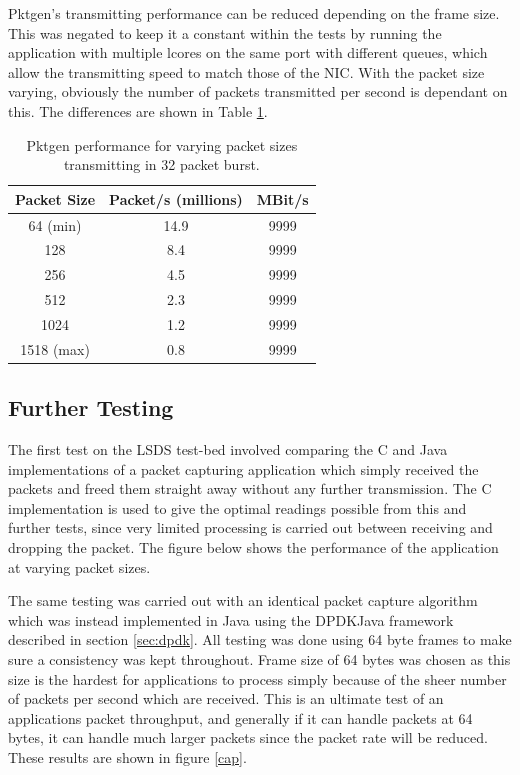 \documentclass[final_report.tex]{subfiles}
\begin{document}
Pktgen's transmitting performance can be reduced depending on the frame size. This was negated to keep it a constant within the tests by running the application with multiple lcores on the same port with different queues, which allow the transmitting speed to match those of the NIC. With the packet size varying, obviously the number of packets transmitted per second is dependant on this. The differences are shown in Table \ref{tab:pktgen}.

\begin{table}[H]
	\centering
	\begin{tabular} { | c | c | c | }
		\hline
		\textbf{Packet Size} & \textbf{Packet/s (millions)} & \textbf{MBit/s} \\
		\hline
		64 (min) & 14.9 & 9999 \\
		\hline
		128 & 8.4 & 9999 \\
		\hline
		256 & 4.5 & 9999 \\
		\hline
		512 & 2.3 & 9999 \\
		\hline
		1024 & 1.2 & 9999 \\
		\hline
		1518 (max) & 0.8 & 9999 \\
		\hline
	\end{tabular}
	\caption{Pktgen performance for varying packet sizes transmitting in 32 packet burst.}
	\label{tab:pktgen}
\end{table}

\subsection{Further Testing}
The first test on the LSDS test-bed involved comparing the C and Java implementations of a packet capturing application which simply received the packets and freed them straight away without any further transmission. The C implementation is used to give the optimal readings possible from this and further tests, since very limited processing is carried out between receiving and dropping the packet. The figure below shows the performance of the application at varying packet sizes.



The same testing was carried out with an identical packet capture algorithm which was instead implemented in Java using the DPDKJava framework described in section \ref{sec:dpdk}. All testing was done using 64 byte frames to make sure a consistency was kept throughout. Frame size of 64 bytes was chosen as this size is the hardest for applications to process simply because of the sheer number of packets per second which are received. This is an ultimate test of an applications packet throughput, and generally if it can handle packets at 64 bytes, it can handle much larger packets since the packet rate will be reduced. These results are shown in figure \ref{cap}.
\end{document}
